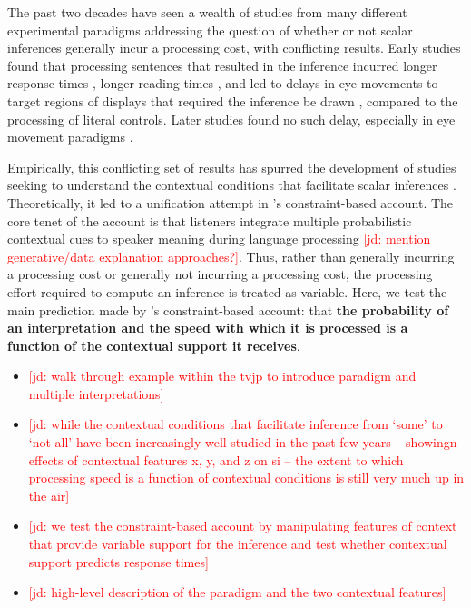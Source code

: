 \documentclass[10pt,letterpaper]{article}
\newcommand{\jd}[1]{\textcolor{Red}{[jd: #1]}}
\begin{document}
The past two decades have seen a wealth of studies from many different experimental paradigms addressing the question of whether or not scalar inferences generally incur a processing cost, with conflicting results. Early studies found that processing sentences that resulted in the inference incurred longer response times \cite{BottNoveck2004, TomlinsonEtAl2012,DegenTanenhaus2015}, longer reading times \cite{BrehenyEtAl2006}, and led to delays in eye movements to target regions of displays that required the inference be drawn \cite{HuangSnedeker2009,HuangSnedeker2011,DegenTanenhaus2016}, compared to the processing of literal controls. Later studies found no such delay, especially in eye movement paradigms \cite{Grodner2010,Breheny2013,DegenTanenhaus2016}. 

Empirically, this conflicting set of results has spurred the development of studies seeking to understand the contextual conditions that facilitate scalar inferences \cite{Zondervan2010,Degen2015,Augurzky2019,MartyChemla2013,DegenGoodman2014}. Theoretically, it led to a unification attempt in 's constraint-based account. The core tenet of the account is that listeners integrate multiple probabilistic contextual cues to speaker meaning during language processing \jd{mention generative/data explanation approaches?}. Thus, rather than generally incurring a processing cost or generally not incurring a processing cost, the processing effort required to compute an inference is treated as variable. Here, we test the main prediction made by 's constraint-based account: that \textbf{the probability of an interpretation and the speed with which it is processed is a function of the contextual support it receives}. 



\begin{itemize}
	\item \jd{walk through example within the tvjp to introduce paradigm and multiple interpretations}
	\item \jd{while the contextual conditions that facilitate inference from `some' to `not all' have been increasingly well studied in the past few years -- showingn effects of contextual features x, y, and z on si -- the extent to which processing speed is a function of contextual conditions is still very much up in the air}
	\item \jd{we test the constraint-based account by manipulating features of context that provide variable support for the inference and test whether contextual support predicts response times}
	\item \jd{high-level description of the paradigm and the two contextual features}
\end{itemize}
\end{document}

